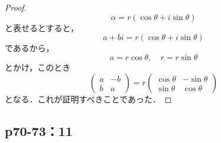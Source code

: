 \documentclass[uplatex,dvipdfmx,a4paper,10pt,fleqn]{jsarticle}
\begin{document}
\begin{tleftbar} 
    \begin{proof}
    \[
        \alpha = r (\cos \theta + i \sin \theta)
    \]
    と表せるとすると，
    \[
        a+bi = r (\cos \theta + i \sin \theta ) 
    \]
    であるから，
    \[
        a= r \cos \theta , \quad r = r \sin \theta
    \]
    とかけ，このとき
    \[
        \begin{pmatrix} a & -b \\ b & a \end{pmatrix} = r \begin{pmatrix} \cos \theta & -\sin \theta \\ \sin \theta & \cos \theta \end{pmatrix}
    \]
    となる．これが証明すべきことであった．
    \end{proof}
\end{tleftbar}

\newpage 

\subsection*{p70-73：11}
\end{document}
